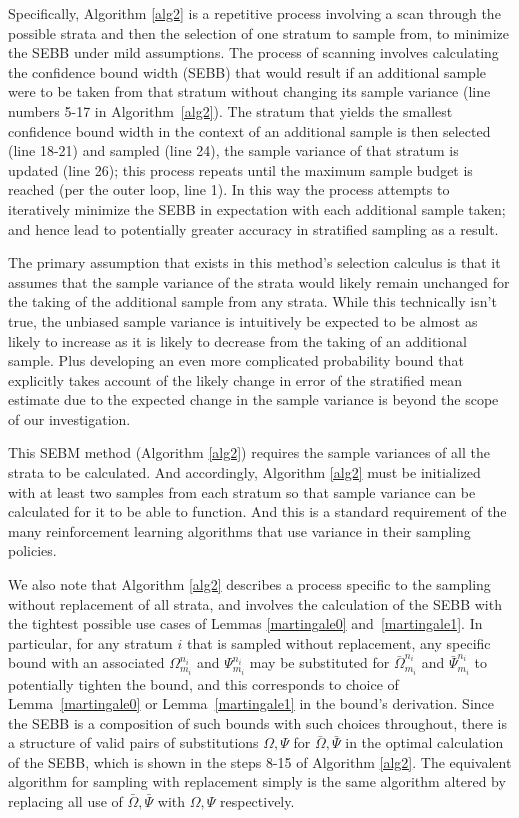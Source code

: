 Specifically, Algorithm \ref{alg2} is a repetitive process involving a scan through the possible strata and then the selection of one stratum to sample from, to minimize the SEBB under mild assumptions.
The process of scanning involves calculating the confidence bound width (SEBB) that would result if an additional sample were to be taken from that stratum without changing its sample variance (line numbers 5-17 in Algorithm~\ref{alg2}).
The stratum that yields the smallest confidence bound width in the context of an additional sample is then selected (line 18-21) and sampled (line 24), the sample variance of that stratum is updated (line 26); 
this process repeats until the maximum sample budget is reached (per the outer loop, line 1).
In this way the process attempts to iteratively minimize the SEBB in expectation with each additional sample taken; and hence lead to potentially greater accuracy in stratified sampling as a result.

The primary assumption that exists in this method's selection calculus is that it assumes that the sample variance of the strata would likely remain unchanged for the taking of the additional sample from any strata.
While this technically isn't true, the unbiased sample variance is intuitively be expected to be almost as likely to increase as it is likely to decrease from the taking of an additional sample.
Plus developing an even more complicated probability bound that explicitly takes account of the likely change in error of the stratified mean estimate due to the expected change in the sample variance is beyond the scope of our investigation.

This SEBM method (Algorithm \ref{alg2}) requires the sample variances of all the strata to be calculated. And accordingly, Algorithm \ref{alg2} must be initialized with at least two samples from each stratum so that sample variance can be calculated for it to be able to function.
And this is a standard requirement of the many reinforcement learning algorithms that use variance in their sampling policies.

We also note that Algorithm \ref{alg2} describes a process specific to the sampling without replacement of all strata, and involves the calculation of the SEBB with the tightest possible use cases of Lemmas \ref{martingale0} and~\ref{martingale1}.
In particular, for any stratum $i$ that is sampled without replacement, any specific bound with an associated $\Omega_{m_i}^{n_i}$ and $\Psi_{m_i}^{n_i}$ may be substituted for $\bar{\Omega}_{m_i}^{n_i}$ and $\bar{\Psi}_{m_i}^{n_i}$ to potentially tighten the bound, and this corresponds to choice of Lemma~\ref{martingale0} or Lemma~\ref{martingale1} in the bound's derivation. 
Since the SEBB is a composition of such bounds with such choices throughout, there is a structure of valid pairs of substitutions $\Omega,\Psi$ for $\bar{\Omega},\bar{\Psi}$ in the optimal calculation of the SEBB, which is shown in the steps 8-15 of Algorithm \ref{alg2}.
The equivalent algorithm for sampling with replacement simply is the same algorithm altered by replacing all use of $\bar{\Omega},\bar{\Psi}$ with $\Omega,\Psi$ respectively.


